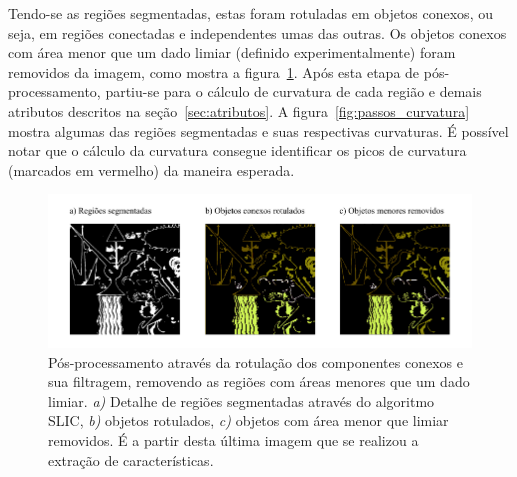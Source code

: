 Tendo-se as regiões segmentadas, estas foram rotuladas em objetos
conexos, ou seja, em regiões conectadas e independentes umas das
outras. Os objetos conexos com área menor que um dado limiar (definido experimentalmente) foram removidos da imagem, como mostra a figura~\ref{fig:rotulacao}. Após esta etapa de pós-processamento, partiu-se
para o cálculo de curvatura de cada região e demais atributos descritos
na seção~\ref{sec:atributos}. A figura~\ref{fig:passos_curvatura} mostra algumas das regiões segmentadas e suas respectivas curvaturas. É possível notar que o cálculo da curvatura consegue identificar os picos de curvatura (marcados em vermelho) da maneira esperada.

\begin{figure}[h!]
\begin{center}
          \caption{Pós-processamento através da rotulação dos componentes
        conexos e sua filtragem, removendo as regiões com áreas
        menores que um dado limiar. \textit{a)} Detalhe de regiões
        segmentadas através do algoritmo SLIC, \textit{b)} objetos
        rotulados, \textit{c)} objetos com área menor que limiar
        removidos. É a partir desta última imagem que se realizou a
        extração de características.}
        \label{fig:rotulacao}
        \includegraphics[scale=1.2]{figs/passos_rotulacao}
        \fonteminha
\end{center}
\end{figure}

